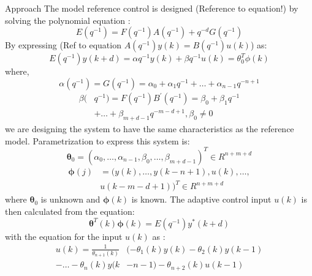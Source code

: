 \begin{section}{Approach}
The model reference control is designed (Reference to equation!) by solving the polynomial equation :
    \begin{equation}
	E(q^{-1})=F(q^{-1})A(q^{-1})+q^{-d}G(q^{-1})
	\end{equation}
By expressing (Ref to equation $A(q^{-1})y(k)=B(q^{-1})u(k)$)  as:
	\begin{equation}
	E(q^{-1})y(k+d)={\alpha}q^{-1}y(k) + {\beta}q^{-1}u(k)=\theta_0^T\phi(k)
	\end{equation}
where,
	\begin{equation}
	\alpha(q^{-1})=G(q^{-1})=\alpha_0+\alpha_1q^{-1}+ \dots +\alpha_{n-1}q^{-n+1}
	\end{equation}
	\begin{align}
	\beta( & q^{-1})=F(q^{-1})B^{'}(q^{-1})=\beta_0+\beta_1q^{-1} \nonumber \\
	& + \dots +\beta_{m+d-1}q^{-m-d+1}, \beta_0\neq0
	\end{align}
we are designing the system to have the same characteristics as the reference model. Parametrization to express this system is:
	\begin{equation}
	\bm{\theta}_0=(\alpha_0, \dots ,\alpha_{n-1},\beta_0, \dots ,\beta_{m+d-1})^T \in R^{n+m+d}
	\end{equation}
	\begin{align}
	\bm{\phi}(j)&=(y(k), \dots ,y(k-n+1),u(k), \dots , \nonumber \\
	& u(k-m-d+1))^T \in R^{n+m+d}
	\end{align}
where $\bm{\theta}_0$ is unknown and $\bm{\phi}(k)$ is known.
	The adaptive control input $u(k)$ is then calculated from the equation:
	\begin{equation}
	\bm{\theta}^T(k)\bm{\phi}(k)=E(q^{-1})y^{*}(k+d)
	\end{equation}
with the equation for the input $u(k)$ as :
	\begin{align}
	u(k)=\frac{1}{\theta_{n+1}(k)}&(-\theta_1(k)y(k)-\theta_2(k)y(k-1)  \nonumber \\
    -\dots-\theta_n(k)y(k&-n-1)-\theta_{n+2}(k)u(k-1)  \\

\end{align}
\end{section}
